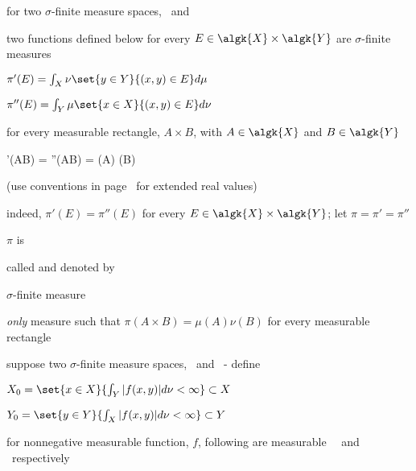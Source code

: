 \documentclass[17pt,landscape]{foils}
\newcommand{\algX}{\algk{X}}
\newcommand{\algY}{\algk{Y}}
\begin{document}
{\bit
\item []
	for two $\sigma$-finite measure spaces, \meas{X}{\algX}{\mu}\ and \meas{Y}{\algY}{\nu}

\vitem
	two functions defined below for every $E\in\algX\times\algY$ are $\sigma$-finite measures

	\bit
	\item
		$\pi'(E) = \int_X \nu\set{y\in Y}{(x,y)\in E} d\mu$
	\item
		$\pi''(E) = \int_Y \mu\set{x\in X}{(x,y)\in E} d\nu$
	\eit

\vitem
	for every measurable rectangle, $A\times B$, with $A\in\algX$ and $B\in\algY$

	\begin{eqn}
		\pi'(A\times B)
		=
		\pi''(A\times B)
		=
		\mu(A) \nu(B)
	\end{eqn}

\item []
	(use conventions in page~\pageref{page:Some conventions} for extended real values)

\vvitem
	indeed, $\pi'(E)=\pi''(E)$ for every $E\in\algX\times\algY$; let $\pi=\pi'=\pi''$

\vitem $\pi$ is
	\bit
	\item
		called %
		and denoted by 
	\item
		$\sigma$-finite measure

	\item
		\emph{only} measure such that $\pi(A\times B) =\mu(A) \nu(B)$ for every measurable rectangle
	\eit

\eit


%

\bit
\item
	suppose two $\sigma$-finite measure spaces, \meas{X}{\algX}{\mu}\ and \meas{Y}{\algY}{\nu}\
	- define
	\bit
	\item
		$X_0 = \set{x\in X}{\int_Y |f(x,y)|d\nu < \infty}\subset X$
	\item
		$Y_0 = \set{y\in Y}{\int_X |f(x,y)|d\nu < \infty}\subset Y$
	\eit

\vitem
	for nonnegative measurable function, $f$,
	following are measurable
	\wrt\ \algX\ and \algY\ respectively

}
\end{document}

